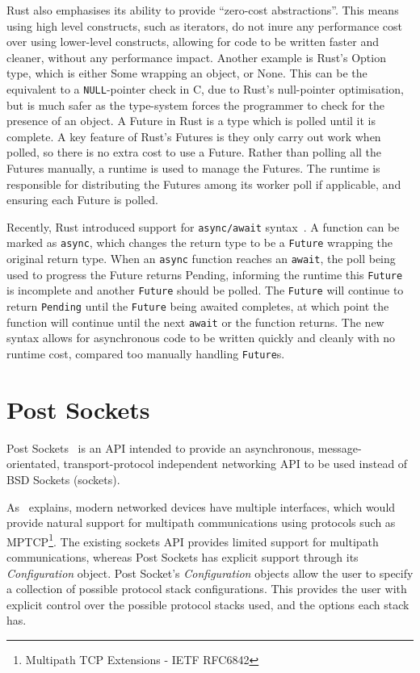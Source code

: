 Rust also emphasises its ability to provide “zero-cost abstractions”.
This means using high level constructs, such as iterators, do not inure any performance cost over using lower-level
constructs, allowing for code to be written faster and cleaner, without any performance impact.
Another example is Rust's Option type, which is either Some wrapping an object, or None.
This can be the equivalent to a \texttt{NULL}-pointer check in C, due to Rust's null-pointer optimisation, but is much
safer as the type-system forces the programmer to check for the presence of an object.
A Future in Rust is a type which is polled until it is complete.
A key feature of Rust's Futures is they only carry out work when polled, so there is no extra cost to use a Future.
Rather than polling all the Futures manually, a runtime is used to manage the Futures.
The runtime is responsible for distributing the Futures among its worker poll if applicable, and ensuring each Future is
polled.

Recently, Rust introduced support for \texttt{async/await} syntax~\citep{withoutboats_asyncawaitnotation_}.
A function can be marked as \texttt{async}, which changes the return type to be a \texttt{Future} wrapping the original
return type.
When an \texttt{async} function reaches an \texttt{await}, the poll being used to progress the Future returns Pending,
informing the runtime this \texttt{Future} is incomplete and another \texttt{Future} should be polled.
The \texttt{Future} will continue to return \texttt{Pending} until the \texttt{Future} being awaited completes,
at which point the function will continue until the next \texttt{await} or the function returns.
The new syntax allows for asynchronous code to be written quickly and cleanly with no runtime cost, compared too
manually handling \texttt{Future}s.

\section{Post Sockets}\label{sec:post-sockets}
Post Sockets~\citep{kuhlewind_postsocketsabstract_} is an API intended to provide an asynchronous, message-orientated,
transport-protocol independent networking API to be used instead of BSD Sockets (sockets).

As~\cite{kuhlewind_postsocketsabstract_} explains, modern networked devices have multiple interfaces, which would
provide natural support for multipath communications using protocols such as
MPTCP\footnote{Multipath TCP Extensions - IETF RFC6842}.
The existing sockets API provides limited support for multipath communications, whereas Post Sockets has explicit
support through its \emph{Configuration} object.
Post Socket's \emph{Configuration} objects allow the user to specify a collection of possible protocol stack
configurations.
This provides the user with explicit control over the possible protocol stacks used, and the options each stack has.

